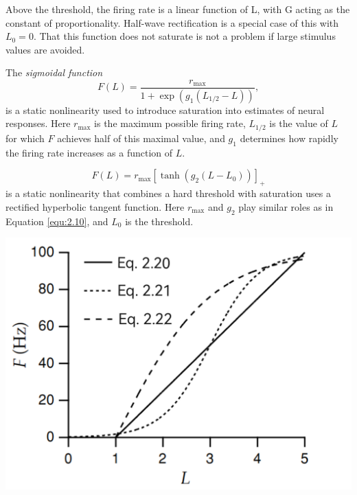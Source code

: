 \begin{rem}
  Above the threshold, the firing rate is a linear function of L, with G acting as the constant of proportionality. Half-wave rectification is a special case of this with $L_0 = 0$. That this function does not saturate is not a problem if large stimulus values are avoided.
\end{rem}

\begin{exm}
  \label{sigmoidalFunction}
  The \emph{sigmoidal function}
  \begin{equation}
    \label{equ:2.10}
    F(L) = \frac{r_{\max}}{1+\exp\left(g_1(L_{1/2}-L)\right)},
  \end{equation}
  is a static nonlinearity used to introduce saturation into estimates of neural responses. Here $r_{\max}$ is the maximum possible firing rate, $L_{1/2}$ is the value of $L$ for which $F$ achieves half of this maximal value, and $g_1$ determines how rapidly the firing rate increases as a function of $L$.
\end{exm}

\begin{exm}
  \begin{equation}
    \label{equ:2.11}
    F(L) = r_{\max}[\tanh(g_2(L-L_0))]_+
  \end{equation}
  is a static nonlinearity that combines a hard threshold with saturation uses a rectified hyperbolic tangent function. Here $r_{\max}$ and $g_2$ play similar roles as in Equation \ref{equ:2.10}, and $L_0$ is the threshold.
\end{exm}

\begin{center}
  \includegraphics[scale=0.2]{./png/NonlinearExample}
\end{center}

